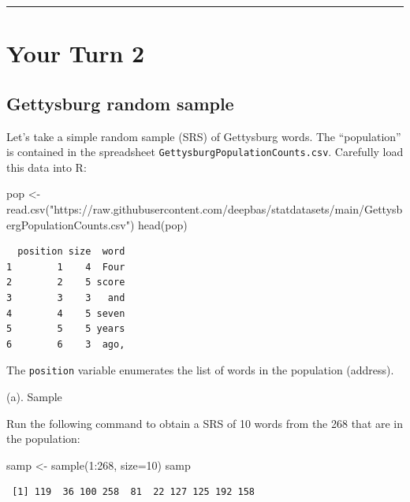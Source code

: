 \documentclass[
]{book}
\newenvironment{Shaded}{\begin{snugshade}}{\end{snugshade}}
\newcommand{\AttributeTok}[1]{\textcolor[rgb]{0.77,0.63,0.00}{#1}}
\newcommand{\DecValTok}[1]{\textcolor[rgb]{0.00,0.00,0.81}{#1}}
\newcommand{\FunctionTok}[1]{\textcolor[rgb]{0.00,0.00,0.00}{#1}}
\newcommand{\NormalTok}[1]{#1}
\newcommand{\OtherTok}[1]{\textcolor[rgb]{0.56,0.35,0.01}{#1}}
\newcommand{\SpecialCharTok}[1]{\textcolor[rgb]{0.00,0.00,0.00}{#1}}
\newcommand{\StringTok}[1]{\textcolor[rgb]{0.31,0.60,0.02}{#1}}
\begin{document}
\begin{center}\rule{0.5\linewidth}{0.5pt}\end{center}

\hypertarget{your-turn-2-1}{%
\section{Your Turn 2}\label{your-turn-2-1}}

\hypertarget{gettysburg-random-sample}{%
\subsection{Gettysburg random sample}\label{gettysburg-random-sample}}

Let's take a simple random sample (SRS) of Gettysburg words. The ``population'' is contained in the
spreadsheet \texttt{GettysburgPopulationCounts.csv}. Carefully load this data into R:

\begin{Shaded}
\begin{Highlighting}[]
\NormalTok{pop }\OtherTok{\textless{}{-}} \FunctionTok{read.csv}\NormalTok{(}\StringTok{"https://raw.githubusercontent.com/deepbas/statdatasets/main/GettysbergPopulationCounts.csv"}\NormalTok{)}
\FunctionTok{head}\NormalTok{(pop)}
\end{Highlighting}
\end{Shaded}

\begin{verbatim}
  position size  word
1        1    4  Four
2        2    5 score
3        3    3   and
4        4    5 seven
5        5    5 years
6        6    3  ago,
\end{verbatim}

The \texttt{position} variable enumerates the list of words in the population (address).

(a). Sample

Run the following command to obtain a SRS of 10 words from the 268 that are in the population:

\begin{Shaded}
\begin{Highlighting}[]
\NormalTok{samp }\OtherTok{\textless{}{-}} \FunctionTok{sample}\NormalTok{(}\DecValTok{1}\SpecialCharTok{:}\DecValTok{268}\NormalTok{, }\AttributeTok{size=}\DecValTok{10}\NormalTok{)}
\NormalTok{samp}
\end{Highlighting}
\end{Shaded}

\begin{verbatim}
 [1] 119  36 100 258  81  22 127 125 192 158
\end{verbatim}
\end{document}
